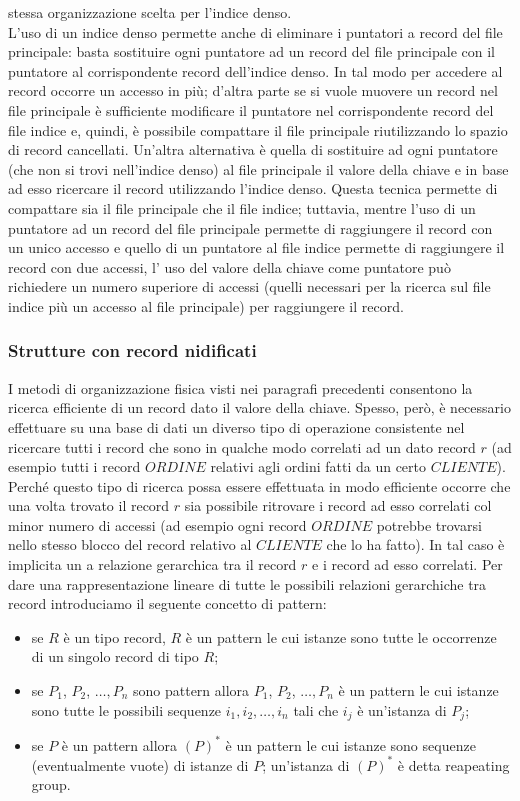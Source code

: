 stessa organizzazione scelta per l'indice denso.\\
L'uso di un indice denso permette anche di eliminare i puntatori a record del file principale: basta
sostituire ogni puntatore ad un record del file principale con il puntatore al corrispondente record
dell'indice denso. In tal modo per accedere al record occorre un accesso in più; d'altra parte se si
vuole muovere un record nel file principale è sufficiente modificare il puntatore nel corrispondente
record del file indice e, quindi, è possibile compattare il file principale riutilizzando lo spazio di
record cancellati. Un'altra alternativa è quella di sostituire ad ogni puntatore (che non si trovi
nell'indice denso) al file principale il valore della chiave e in base ad esso ricercare il record
utilizzando l'indice denso. Questa tecnica permette di compattare sia il file principale che il file
indice; tuttavia, mentre l'uso di un puntatore ad un record del file principale permette di raggiungere
il record con un unico accesso e quello di un puntatore al file indice permette di raggiungere il
record con due accessi, l' uso del valore della chiave come puntatore può richiedere un numero
superiore di accessi (quelli necessari per la ricerca sul file indice più un accesso al file principale)
per raggiungere il record.

\subsubsection{Strutture con record nidificati}
I metodi di organizzazione fisica visti nei paragrafi precedenti consentono la ricerca efficiente di un
record dato il valore della chiave. Spesso, però, è necessario effettuare su una base di dati un
diverso tipo di operazione consistente nel ricercare tutti i record che sono in qualche modo correlati
ad un dato record $r$ (ad esempio tutti i record $ORDINE$ relativi agli ordini fatti da un certo
$CLIENTE$). Perché questo tipo di ricerca possa essere effettuata in modo efficiente occorre che una
volta trovato il record $r$ sia possibile ritrovare i record ad esso correlati col minor numero di accessi
(ad esempio ogni record $ORDINE$ potrebbe trovarsi nello stesso blocco del record relativo al
$CLIENTE$ che lo ha fatto). In tal caso è implicita un a relazione gerarchica tra il record $r$ e i record
ad esso correlati. Per dare una rappresentazione lineare di tutte le possibili relazioni gerarchiche tra
record introduciamo il seguente concetto di pattern:
\begin{itemize}
 \item se $R$ è un tipo record, $R$ è un pattern le cui istanze sono tutte le occorrenze di un singolo record di
tipo $R$;
 \item se $P_1$, $P_2$, $\ldots, P_n$ sono pattern allora $P_1$, $P_2$, $\ldots, P_n$ è un pattern le cui istanze
 sono tutte le possibili sequenze $i_1, i_2, \ldots, i_n$ tali che $i_j$ è un'istanza di $P_j$;
 \item se $P$ è un pattern allora $(P)^*$ è un pattern le cui istanze sono sequenze (eventualmente vuote) di
istanze di $P$; un'istanza di $(P)^*$ è detta reapeating group.
\end{itemize}

